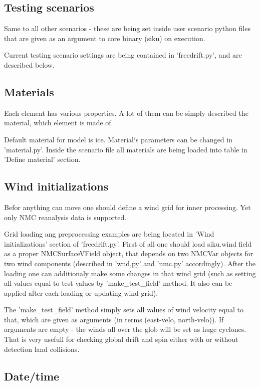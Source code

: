 \subsection{Testing scenarios}

Same to all other scenarios - these are being set inside user scenario 
python files that are given as an argument to core binary (siku) on 
execution.

Current testing scenario settings are being contained in 'freedrift.py', 
and are described below.

\subsection{Materials}

Each element has various properties. A lot of them can be simply described
the material, which element is made of. 

Default material for model is ice.  Material`s parameters can be changed in 
'material.py'. Inside the scenario file all materials are being loaded into 
table in 'Define material' section.

\subsection{Wind initializations}

Befor anything can move one should define a wind grid for inner processing.
Yet only NMC reanalysis data is supported. 

Grid loading ang preprocessing examples are being located in 
'Wind initializations' section of 'freedrift.py'.
First of all one should load siku.wind field as a proper NMCSurfaceVField
object, that depends on two NMCVar objects for two wind components 
(described in 'wnd,py' and 'nmc.py' accordingly).
After the loading one can additionaly make some changes in that wind grid 
(such as setting all values equal to test values by 'make\_test\_field' 
method. It also can be applied after each loading or updating wind grid).

The 'make\_test\_field' method simply sets all values of wind velocity equal 
to that, which are given as arguments (in terms (east-velo, north-velo)).
If arguments are empty - the winds all over the glob will be set as huge 
cyclones. That is very usefull for checking global drift and spin either 
with or without detection land collisions. 

\subsection{Date/time}

